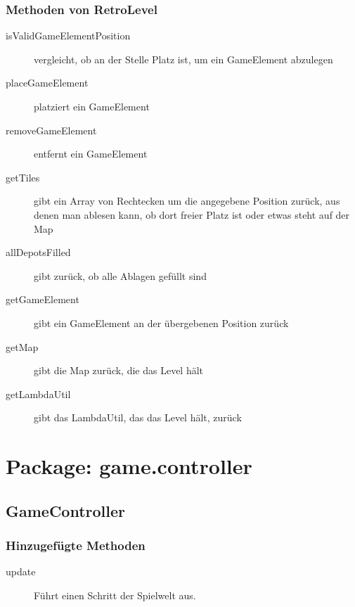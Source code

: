 \documentclass[parskip=full]{scrreprt}
\begin{document}
\subsubsection{Methoden von RetroLevel}

\begin{description}
	
	\item[isValidGameElementPosition] vergleicht, ob an der Stelle Platz ist, um ein GameElement abzulegen
	\item[placeGameElement] platziert ein GameElement
	\item[removeGameElement] entfernt ein GameElement
	\item[getTiles] gibt ein Array von Rechtecken um die angegebene Position zurück, aus denen man ablesen kann, ob dort freier Platz ist oder etwas steht auf der Map
	\item[allDepotsFilled] gibt zurück, ob alle Ablagen gefüllt sind
	\item[getGameElement] gibt ein GameElement an der übergebenen Position zurück
	\item[getMap] gibt die Map zurück, die das Level hält
	\item[getLambdaUtil] gibt das LambdaUtil, das das Level hält, zurück
	
\end{description}


\section{Package: game.controller}

\subsection{GameController}

\subsubsection{Hinzugefügte Methoden}
\begin{description}
	\item[update] Führt einen Schritt der Spielwelt aus.
\end{description}
\end{document}

